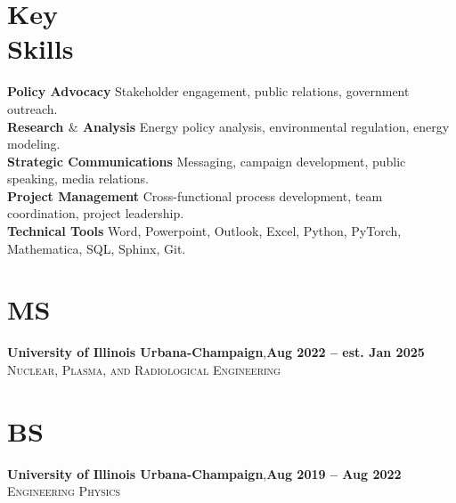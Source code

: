\documentclass[margin,line]{resume}
\begin{document}
\begin{resume}
    \section{\mysidestyle Key\\Skills}
        \textbf{Policy Advocacy} Stakeholder engagement, public relations, government outreach.\vspace{1mm}\\
        \textbf{Research $\&$ Analysis} Energy policy analysis, environmental regulation, energy modeling.\vspace{1mm}\\
        \textbf{Strategic Communications} Messaging, campaign development, public speaking, media relations.\vspace{1mm}\\
        \textbf{Project Management} Cross-functional process development, team coordination, project leadership.\vspace{1mm}\\
        \textbf{Technical Tools} Word, Powerpoint, Outlook, Excel, Python, PyTorch, Mathematica, SQL, Sphinx, Git.\vspace{1mm}
    \section{\mysidestyle MS}
    \textbf{University of Illinois Urbana-Champaign},\hfill\textbf{Aug 2022 -- est. Jan 2025}\\
    \textsc{Nuclear, Plasma, and Radiological Engineering}\\
    \vspace{-5.5mm}
    \section{\mysidestyle BS}
    \textbf{University of Illinois Urbana-Champaign},\hfill\textbf{Aug 2019 -- Aug 2022}\\%
    \textsc{Engineering Physics}\\
    \vspace{-5mm}


\end{resume}
\end{document}
